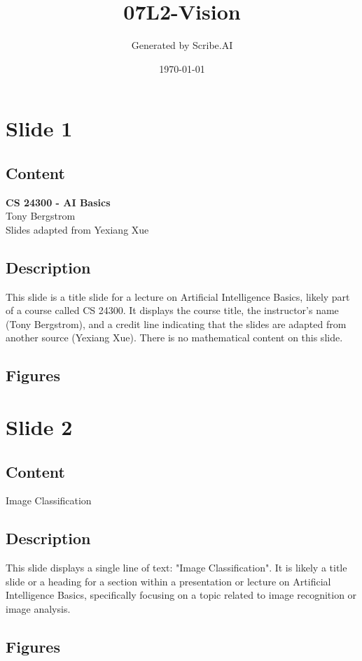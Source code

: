 \documentclass{article}%
\title{07L2{-}Vision}%
\author{Generated by Scribe.AI}%
\date{\today}%
\begin{document}
%
\normalsize%
\maketitle%
\section{Slide 1}%
\label{sec:Slide1}%
\subsection{Content}%

\textbf{CS 24300 - AI Basics} \\
Tony Bergstrom \\
Slides adapted from Yexiang Xue
%
\subsection{Description}%
This slide is a title slide for a lecture on Artificial Intelligence Basics, likely part of a course called CS 24300.  It displays the course title, the instructor's name (Tony Bergstrom), and a credit line indicating that the slides are adapted from another source (Yexiang Xue).  There is no mathematical content on this slide.%
\subsection{Figures}%
\begin{figure}[H]%
\centering%
\end{figure}

%
\newpage%
\section{Slide 2}%
\label{sec:Slide2}%
\subsection{Content}%

Image Classification
%
\subsection{Description}%
This slide displays a single line of text: "Image Classification".  It is likely a title slide or a heading for a section within a presentation or lecture on Artificial Intelligence Basics, specifically focusing on a topic related to image recognition or image analysis.%
\subsection{Figures}%
\begin{figure}[H]%
\centering%
\end{figure}
\end{document}
